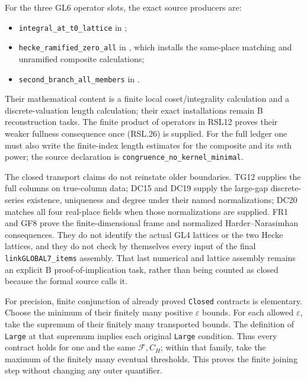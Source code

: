 For the three GL6 operator slots, the exact source producers are:
\begingroup\raggedright
\begin{itemize}
\item \texttt{integral\_at\_t0\_lattice} in
;
\item \texttt{hecke\_ramified\_zero\_all} in
,
which installs the same-place matching and unramified
composite calculations;
\item \texttt{second\_branch\_all\_members} in
.
\end{itemize}
\endgroup
Their mathematical content is a finite local coset/integrality
calculation and a discrete-valuation length calculation;
their exact installations remain B reconstruction tasks.
The finite product of operators in RSL12 proves their
weaker fullness consequence once (RSL.26) is supplied.
For the full ledger one must also write the finite-index
length estimates for the composite and its $m$th power;
the source declaration is
\texttt{congruence\_no\_kernel\_minimal}.

The closed transport claims do not reinstate older
boundaries.  TG12 supplies the full columns on true-column
data; DC15 and DC19 supply the large-gap discrete-series
existence, uniqueness and degree under their named
normalizations; DC20 matches all four real-place fields
when those normalizations are supplied.  FR1 and GF8
prove the finite-dimensional frame and normalized
Harder--Narasimhan consequences.  They do not identify
the actual GL4 lattices or the two Hecke lattices, and
they do not check by themselves every input of the final
\texttt{linkGLOBAL7\_items} assembly.  That last numerical
and lattice assembly remains an explicit B proof-of-implication
task, rather than being counted as closed because the
formal source calls it.

For precision, finite conjunction of already proved
\texttt{Closed} contracts is elementary.  Choose the
minimum of their finitely many positive $\varepsilon$
bounds.  For each allowed $\varepsilon$, take the supremum
of their finitely many transported bounds.  The definition
of \texttt{Large} at that supremum implies each original
\texttt{Large} condition.  Thus every contract holds for
one and the same $\mathcal F,C_H$; within that family,
take the maximum of the finitely many eventual thresholds.
This proves the finite joining step without changing
any outer quantifier.

